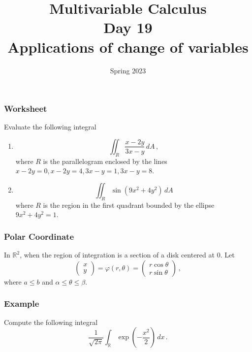 \documentclass[aspectratio=169]{beamer}
\title{ Multivariable Calculus \\ Day  19 \\ Applications of change of variables }
\date{Spring 2023}
\newcommand{\R}{\mathbb{R}}
\begin{document}
\maketitle


\begin{frame}
    \frametitle{Worksheet}
    Evaluate the following integral
    \begin{enumerate}
        \item 
            \begin{equation*}
                \iint_R \frac{x - 2y}{3x - y} \, dA \,,
            \end{equation*}
            where $R$ is the parallelogram enclosed by the lines
            $x-2y = 0, x- 2y = 4, 3x-y = 1, 3x - y = 8$.

        \item 
            \begin{equation*}
                \iint_R \sin(9x^2 + 4y^2) \, dA
            \end{equation*}
            where $R$ is the region in the first quadrant bounded
            by the ellipse $9x^2 + 4y^2 = 1$.
    \end{enumerate}
\end{frame}

\begin{frame}
    \frametitle{Polar Coordinate}
    In $\R^2$,
    when the region of integration is a section of a disk  centered at $0$.
    Let
    \begin{equation*}
        \begin{pmatrix}
            x \\ y
        \end{pmatrix}
        =
        \varphi(r,\theta) = 
        \begin{pmatrix}
            r\cos\theta \\
            r\sin\theta 
        \end{pmatrix} \,,
    \end{equation*}
    where $a \leq b$ and $\alpha \leq \theta \leq \beta$.
\end{frame}

\begin{frame}
    \frametitle{Example}
    Compute the following integral
    \begin{equation*}
        \frac{1}{\sqrt{2\pi}}\int_{\R} \exp\left(-\frac{x^2}{2}\right) \, dx \,.
    \end{equation*}
\end{frame}
\end{document}
